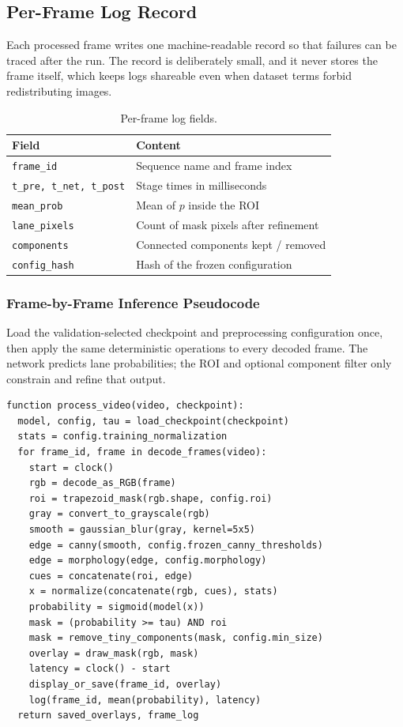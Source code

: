 \documentclass[10pt,a4paper,twocolumn]{article}
\begin{document}
\subsection{Per-Frame Log Record}
Each processed frame writes one machine-readable record so that failures can be traced after the run. The record is deliberately small, and it never stores the frame itself, which keeps logs shareable even when dataset terms forbid redistributing images.

\begin{table}[H]
\centering
\caption{Per-frame log fields.}
\footnotesize
\begin{tabularx}{\columnwidth}{|l|X|}
\hline
\rowcolor{gray!18}\textbf{Field}&\textbf{Content}\\ \hline
\texttt{frame\_id} & Sequence name and frame index\\ \hline
\texttt{t\_pre, t\_net, t\_post} & Stage times in milliseconds\\ \hline
\texttt{mean\_prob} & Mean of $p$ inside the ROI\\ \hline
\texttt{lane\_pixels} & Count of mask pixels after refinement\\ \hline
\texttt{components} & Connected components kept / removed\\ \hline
\texttt{config\_hash} & Hash of the frozen configuration\\ \hline
\end{tabularx}
\end{table}

\subsubsection*{Frame-by-Frame Inference Pseudocode}
Load the validation-selected checkpoint and preprocessing configuration once, then apply the same deterministic operations to every decoded frame. The network predicts lane probabilities; the ROI and optional component filter only constrain and refine that output.

\begin{lstlisting}
function process_video(video, checkpoint):
  model, config, tau = load_checkpoint(checkpoint)
  stats = config.training_normalization
  for frame_id, frame in decode_frames(video):
    start = clock()
    rgb = decode_as_RGB(frame)
    roi = trapezoid_mask(rgb.shape, config.roi)
    gray = convert_to_grayscale(rgb)
    smooth = gaussian_blur(gray, kernel=5x5)
    edge = canny(smooth, config.frozen_canny_thresholds)
    edge = morphology(edge, config.morphology)
    cues = concatenate(roi, edge)
    x = normalize(concatenate(rgb, cues), stats)
    probability = sigmoid(model(x))
    mask = (probability >= tau) AND roi
    mask = remove_tiny_components(mask, config.min_size)
    overlay = draw_mask(rgb, mask)
    latency = clock() - start
    display_or_save(frame_id, overlay)
    log(frame_id, mean(probability), latency)
  return saved_overlays, frame_log
\end{lstlisting}
\end{document}
